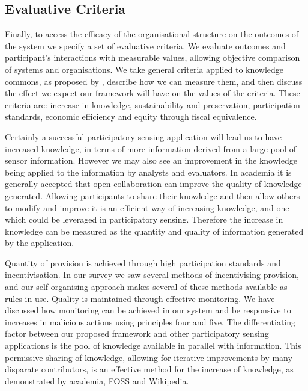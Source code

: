 \begin{itemize}
\end{itemize}

\subsection{Evaluative Criteria}

Finally, to access the efficacy of the organisational structure on the outcomes of the system we specify a set of evaluative criteria. 
We evaluate outcomes and participant's interactions with measurable values, allowing objective comparison of systems and organisations. 
We take general criteria applied to knowledge commons, as proposed by , describe how we can measure them, and then discuss the effect we expect our framework will have on the values of the criteria. 
These criteria are: increase in knowledge, sustainability and preservation, participation standards, economic efficiency and equity through fiscal equivalence.

Certainly a successful participatory sensing application will lead us to have increased knowledge, in terms of more information derived from a large pool of sensor information. 
However we may also see an improvement in the knowledge being applied to the information by analysts and evaluators. In academia it is generally accepted that open collaboration can improve the quality of knowledge generated. Allowing participants to share their knowledge and then allow others to modify and improve it is an efficient way of increasing knowledge, and one which could be leveraged in participatory sensing. Therefore the increase in knowledge can be measured as the quantity and quality of information generated by the application.

Quantity of provision is achieved through high participation standards and incentivisation. 
In our survey we saw several methods of incentivising provision, and our self-organising approach makes several of these methods available as rules-in-use. 
Quality is maintained through effective monitoring. 
We have discussed how monitoring can be achieved in our system and be responsive to increases in malicious actions using principles four and five. 
The differentiating factor between our proposed framework and other participatory sensing applications is the pool of knowledge available in parallel with information. This permissive sharing of knowledge, allowing for iterative improvements by many disparate contributors, is an effective method for the increase of knowledge, as demonstrated by academia, FOSS and Wikipedia.

